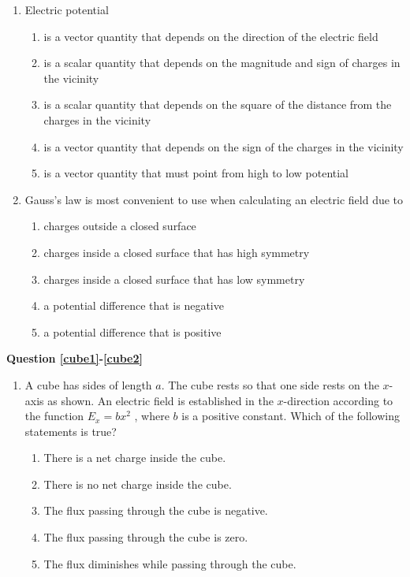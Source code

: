 \documentclass{../../../oss-apphys}
\begin{document}
\begin{multicols}{2}
\begin{enumerate}[leftmargin=18pt]
  \item Electric potential
    \begin{enumerate}[noitemsep,topsep=0pt,leftmargin=18pt,label=(\Alph*)]
    \item is a vector quantity that depends on the direction of the electric
      field
    \item is a scalar quantity that depends on the magnitude and sign of charges
      in the vicinity
    \item is a scalar quantity that depends on the square of the distance from
      the charges in the vicinity
    \item is a vector quantity that depends on the sign of the charges in the
      vicinity
    \item is a vector quantity that must point from high to low potential
    \end{enumerate}

  \item Gauss's law is most convenient to use when calculating an electric field
    due to
    \begin{enumerate}[noitemsep,topsep=0pt,leftmargin=18pt,label=(\Alph*)]
    \item charges outside a closed surface
    \item charges inside a closed surface that has high symmetry
    \item charges inside a closed surface that has low symmetry
    \item a potential difference that is negative
    \item a potential difference that is positive
    \end{enumerate}  
  \end{enumerate}

  \columnbreak
  
  \textbf{Question \ref{cube1}-\ref{cube2}}
  \begin{enumerate}[leftmargin=18pt,resume]
  \item A cube has sides of length $a$. The cube rests so that one side rests on
    the $x$-axis as shown. An electric field is established in the $x$-direction
    according to the function $E_x=bx^2$ , where $b$ is a positive constant.
    Which of the following statements is true?
    \label{cube1}
    \begin{center}
      \vspace{-.15in}
    \end{center}
    \begin{enumerate}[noitemsep,topsep=0pt,leftmargin=18pt,label=(\Alph*)]
    \item\vspace{-.2in}There is a net charge inside the cube.
    \item There is no net charge inside the cube.
    \item The flux passing through the cube is negative.
    \item The flux passing through the cube is zero.
    \item The flux diminishes while passing through the cube.
    \end{enumerate}


\end{enumerate}
\end{multicols}
\end{document}
